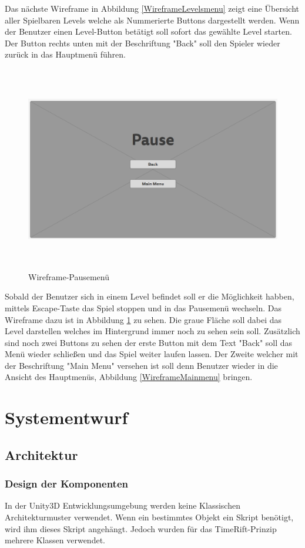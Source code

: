 Das nächste Wireframe in Abbildung \ref{WireframeLevelsmenu} zeigt eine Übersicht aller Spielbaren Levels welche als Nummerierte Buttons dargestellt werden. Wenn der Benutzer einen Level-Button betätigt soll  sofort das gewählte Level starten. Der Button rechts unten mit der Beschriftung "Back" soll den Spieler wieder zurück in das Hauptmenü führen. 
\begin{figure}[H]
	\centering
	\includegraphics[width=16cm, height=9cm]{images/WireframePausemenu.png}
	\caption{Wireframe-Pausemenü}
	\label{WireframePausemenu}
\end{figure}
Sobald der Benutzer sich in einem Level befindet soll er die Möglichkeit habben, mittels Escape-Taste das Spiel stoppen und in das Pausemenü wechseln. Das Wireframe dazu ist in Abbildung \ref{WireframePausemenu} zu sehen. Die graue Fläche soll dabei das Level darstellen welches im Hintergrund immer noch zu sehen sein soll. Zusätzlich sind noch zwei Buttons zu sehen der erste Button mit dem Text "Back" soll das Menü wieder schließen und das Spiel weiter laufen lassen. Der Zweite welcher mit der Beschriftung "Main Menu" versehen ist soll denn Benutzer wieder in die Ansicht des Hauptmenüs, Abbildung \ref{WireframeMainmenu} bringen. 
\chapter{Systementwurf}

\section{Architektur}

\subsection{Design der Komponenten}
In der Unity3D Entwicklungsumgebung werden keine Klassischen Architekturmuster verwendet. Wenn ein bestimmtes Objekt ein Skript benötigt, wird ihm dieses Skript angehängt. Jedoch wurden für das TimeRift-Prinzip mehrere Klassen verwendet.


